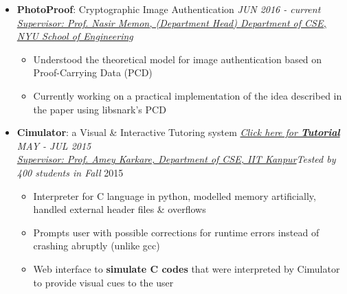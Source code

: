 \documentclass[letterpaper,11pt]{article}
\begin{document}
{\begin{itemize}
    \item \textbf{PhotoProof}: Cryptographic Image Authentication \hfill \textit{JUN 2016 - current}\\
    \href{http://engineering.nyu.edu/people/nasir-memon}{\textit{Supervisor: Prof. Nasir Memon, (Department Head) Department of CSE, NYU School of Engineering}}
    \vspace{-5pt}
    \begin{itemize}
        \item Understood the theoretical model for image authentication based on Proof-Carrying Data (PCD)
        \vspace{-2pt}
        \item Currently working on a practical implementation of the idea described in the paper using libsnark's PCD
        \vspace{-2pt}
    \end{itemize}
    \vspace{-5pt}
    \item \textbf{Cimulator}: a Visual \& Interactive Tutoring system\hspace{0.2in} \href{http://home.iitk.ac.in/~kunalkap/Cimulator.html}{\textit{Click here for \textbf{Tutorial}}} \hfill \textit{MAY - JUL 2015} \\
    \href{http://www.cse.iitk.ac.in/users/karkare/}{\textit{Supervisor: Prof. Amey Karkare, Department of CSE, IIT Kanpur}}\hfill \textit{Tested by 400 students in Fall} 2015\\
        \vspace{-5pt}
        \begin{itemize}
            \item Interpreter for C language in python, modelled memory artificially, handled external header files \& overflows
            \vspace{-2pt}
            \item Prompts user with possible corrections for runtime errors instead of crashing abruptly (unlike gcc)
            \vspace{-2pt}
            \item Web interface to \textbf{simulate C codes} that were interpreted by Cimulator to provide visual cues to the user
            \vspace{-2pt}
        \end{itemize}
\end{itemize}

}
\end{document}

